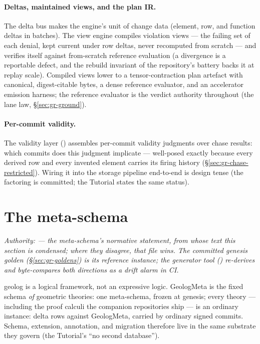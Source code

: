 \paragraph{Deltas, maintained views, and the plan IR.} The delta bus
makes the engine's unit of change data (element, row, and function
deltas in batches). The view engine compiles violation views —
the failing set of each denial, kept current under row deltas, never
recomputed from scratch — and verifies itself against from-scratch
reference evaluation (a divergence is a reportable defect, and the
rebuild invariant of the repository's battery backs it at replay
scale). Compiled views lower to a tensor-contraction plan artefact
with canonical, digest-citable bytes, a dense reference evaluator,
and an accelerator emission harness; the reference evaluator is the
verdict authority throughout (the lane law,
\S\ref{sec:gr-ground}).

\paragraph{Per-commit validity.} The validity layer
() assembles per-commit validity
judgments over chase results: which commits does this judgment
implicate — well-posed exactly because every derived row and every
invented element carries its firing history
(\S\ref{sec:gr-chase-restricted}). Wiring it into the storage
pipeline end-to-end is design tense (the factoring is committed; the
Tutorial states the same status).

\section{The meta-schema}
\label{sec:gr-meta}

\emph{Authority:  — the meta-schema's
normative statement, from whose text this section is condensed; where
they disagree, that file wins. The committed genesis golden
(\S\ref{sec:gr-goldens}) is its reference instance; the generator
tool () re-derives and
byte-compares both directions as a drift alarm in CI.}

geolog is a logical framework, not an expressive logic. GeologMeta is
the fixed schema \emph{of} geometric theories: one meta-schema,
frozen at genesis; every theory — including the proof calculi the
companion repositories ship — is an ordinary instance: delta rows
against GeologMeta, carried by ordinary signed commits. Schema,
extension, annotation, and migration therefore live in the same
substrate they govern (the Tutorial's ``no second database'').

